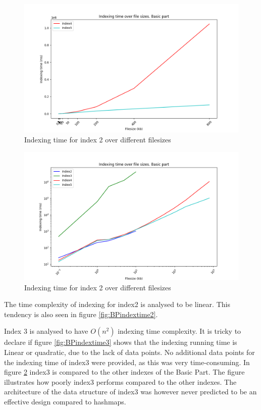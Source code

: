 \begin{figure}[H]
    \centering
    \includegraphics[width=.8\textwidth]{LaTeX/Figures/BasicPart/BPIndexing[4, 5].png}
    \caption{Indexing time for index 2 over different filesizes}
    \label{fig:BPindextime45}
\end{figure}

\begin{figure}[H]
    \centering
    \includegraphics[width=.8\textwidth]{LaTeX/Figures/BasicPart/BPIndexing[2, 3, 4, 5].png}
    \caption{Indexing time for index 2 over different filesizes}
    \label{fig:BPindextime2345}
\end{figure}

The time complexity of indexing for index2 is analysed to be linear. This tendency is also seen in figure \ref{fig:BPindextime2}.

Index 3 is analysed to have $O(n^2)$ indexing time complexity. It is tricky to declare if figure \ref{fig:BPindextime3} shows that the indexing running time is Linear or quadratic, due to the lack of data points. No additional data points for the indexing time of index3 were provided, as this was very time-consuming. In figure \ref{fig:BPindextime2345} index3 is compared to the other indexes of the Basic Part. The figure illustrates how poorly index3 performs compared to the other indexes. The architecture of the data structure of index3 was however never predicted to be an effective design compared to hashmaps.  


